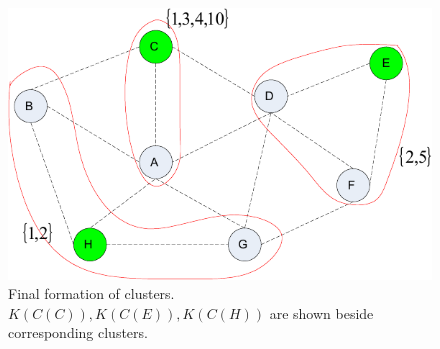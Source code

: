 \documentclass[10pt,journal,compsoc]{IEEEtran}
\theoremstyle{mytheoremstyle}
\theoremstyle{mytheoremstyle}
\theoremstyle{mytheoremstyle}
\begin{document}

\begin{figure}[h]
  \centering
  \includegraphics[width=0.5\linewidth]{final_clustering_ross.pdf}
  \caption{Final formation of clusters. $K(C(C)),K(C(E)),K(C(H))$ are shown beside corresponding clusters.}
  \label{final_clustering_ross}
\end{figure}
\end{document}
